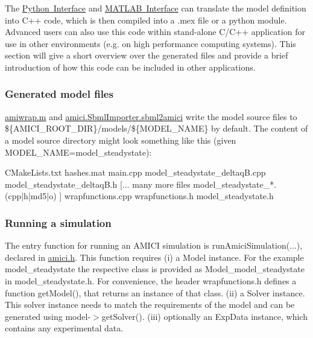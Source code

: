 The \mbox{\hyperlink{python_interface}{Python Interface}} and \mbox{\hyperlink{matlab_interface}{M\+A\+T\+L\+AB Interface}} can translate the model definition into C++ code, which is then compiled into a .mex file or a python module. Advanced users can also use this code within stand-\/alone C/\+C++ application for use in other environments (e.\+g. on high performance computing systems). This section will give a short overview over the generated files and provide a brief introduction of how this code can be included in other applications.

\subsubsection*{Generated model files}

{\ttfamily \mbox{\hyperlink{amiwrap_8m}{amiwrap.\+m}}} and {\ttfamily \mbox{\hyperlink{classamici_1_1sbml__import_1_1_sbml_importer_a83900bb62c0121eb798939a6d4232a9c}{amici.\+Sbml\+Importer.\+sbml2amici}}} write the model source files to \$\{A\+M\+I\+C\+I\+\_\+\+R\+O\+O\+T\+\_\+\+D\+IR\}/models/\$\{M\+O\+D\+E\+L\+\_\+\+N\+A\+ME\} by default. The content of a model source directory might look something like this (given {\ttfamily M\+O\+D\+E\+L\+\_\+\+N\+A\+ME=model\+\_\+steadystate})\+:


\begin{DoxyCode}
CMakeLists.txt
hashes.mat 
main.cpp 
model\_steadystate\_deltaqB.cpp 
model\_steadystate\_deltaqB.h 
[... many more files model\_steadystate\_*.(cpp|h|md5|o) ]
wrapfunctions.cpp 
wrapfunctions.h 
model\_steadystate.h 
\end{DoxyCode}


\subsubsection*{Running a simulation}

The entry function for running an A\+M\+I\+CI simulation is {\ttfamily run\+Amici\+Simulation(...)}, declared in \mbox{\hyperlink{amici_8h_source}{amici.\+h}}. This function requires (i) a {\ttfamily Model} instance. For the example {\ttfamily model\+\_\+steadystate} the respective class is provided as {\ttfamily Model\+\_\+model\+\_\+steadystate} in {\ttfamily model\+\_\+steadystate.\+h}. For convenience, the header {\ttfamily wrapfunctions.\+h} defines a function {\ttfamily get\+Model()}, that returns an instance of that class. (ii) a {\ttfamily Solver} instance. This solver instance needs to match the requirements of the model and can be generated using {\ttfamily model-\/$>$get\+Solver()}. (iii) optionally an {\ttfamily Exp\+Data} instance, which contains any experimental data.

